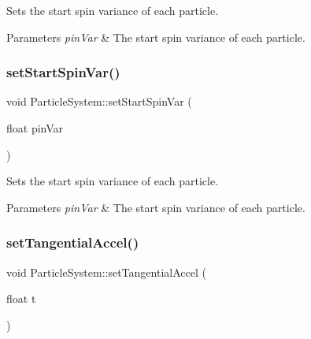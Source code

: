 Sets the start spin variance of each particle.


\begin{DoxyParams}{Parameters}
{\em pin\+Var} & The start spin variance of each particle. \\
\hline
\end{DoxyParams}
\mbox{\label{classParticleSystem_a3aff3de1fe852501893966352c7ccd37}} 
\subsubsection{\texorpdfstring{set\+Start\+Spin\+Var()}{setStartSpinVar()}\hspace{0.1cm}{\footnotesize\ttfamily [2/2]}}
{\footnotesize\ttfamily void Particle\+System\+::set\+Start\+Spin\+Var (\begin{DoxyParamCaption}\item[{float}]{pin\+Var }\end{DoxyParamCaption})\hspace{0.3cm}{\ttfamily [inline]}}

Sets the start spin variance of each particle.


\begin{DoxyParams}{Parameters}
{\em pin\+Var} & The start spin variance of each particle. \\
\hline
\end{DoxyParams}
\mbox{\label{classParticleSystem_a7dbd2f0d4e98bbbd1cc6afe3ea8d6acb}} 
\subsubsection{\texorpdfstring{set\+Tangential\+Accel()}{setTangentialAccel()}\hspace{0.1cm}{\footnotesize\ttfamily [1/2]}}
{\footnotesize\ttfamily void Particle\+System\+::set\+Tangential\+Accel (\begin{DoxyParamCaption}\item[{float}]{t }\end{DoxyParamCaption})\hspace{0.3cm}{\ttfamily [virtual]}}

